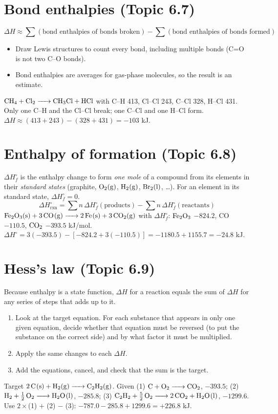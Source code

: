 \documentclass[11pt]{article}
\begin{document}
\section{Bond enthalpies (Topic 6.7)}\label{t:6.7}
\[ \Delta H \approx \sum(\text{bond enthalpies of bonds broken}) - \sum(\text{bond enthalpies of bonds formed}) \]
\begin{itemize}
\item Draw Lewis structures to count every bond, including multiple bonds (C=O is not two C--O bonds).
\item Bond enthalpies are averages for gas-phase molecules, so the result is an estimate.
\end{itemize}
 $\ce{CH4 + Cl2 -> CH3Cl + HCl}$ with C--H 413, Cl--Cl 243, C--Cl 328, H--Cl 431. Only one C--H and the Cl--Cl break; one C--Cl and one H--Cl form. $\Delta H \approx (413 + 243) - (328 + 431) = -103$ kJ.

\section{Enthalpy of formation (Topic 6.8)}\label{t:6.8}
$\Delta H_f^\circ$ is the enthalpy change to form \emph{one mole} of a compound from its elements in their \emph{standard states} (graphite, $\ce{O2(g)}$, $\ce{H2(g)}$, $\ce{Br2(l)}$, \dots). For an element in its standard state, $\Delta H_f^\circ = 0$.
\[ \Delta H^\circ_{\text{rxn}} = \sum n\,\Delta H_f^\circ(\text{products}) - \sum n\,\Delta H_f^\circ(\text{reactants}) \]
 $\ce{Fe2O3(s) + 3CO(g) -> 2Fe(s) + 3CO2(g)}$ with $\Delta H_f^\circ$: $\ce{Fe2O3}$ $-824.2$, CO $-110.5$, $\ce{CO2}$ $-393.5$ kJ/mol. $\Delta H^\circ = 3(-393.5) - [-824.2 + 3(-110.5)] = -1180.5 + 1155.7 = -24.8$ kJ.

\section{Hess's law (Topic 6.9)}\label{t:6.9}
Because enthalpy is a state function, $\Delta H$ for a reaction equals the sum of $\Delta H$ for any series of steps that adds up to it.
\begin{enumerate}
\item Look at the target equation. For each substance that appears in only one given equation, decide whether that equation must be reversed (to put the substance on the correct side) and by what factor it must be multiplied.
\item Apply the same changes to each $\Delta H$.
\item Add the equations, cancel, and check that the sum is the target.
\end{enumerate}
 Target $\ce{2C(s) + H2(g) -> C2H2(g)}$. Given (1) $\ce{C + O2 -> CO2}$, $-393.5$; (2) $\ce{H2 + 1/2O2 -> H2O(l)}$, $-285.8$; (3) $\ce{C2H2 + 5/2O2 -> 2CO2 + H2O(l)}$, $-1299.6$. Use $2\times$(1) $+$ (2) $-$ (3): $-787.0 - 285.8 + 1299.6 = +226.8$ kJ.
\end{document}
